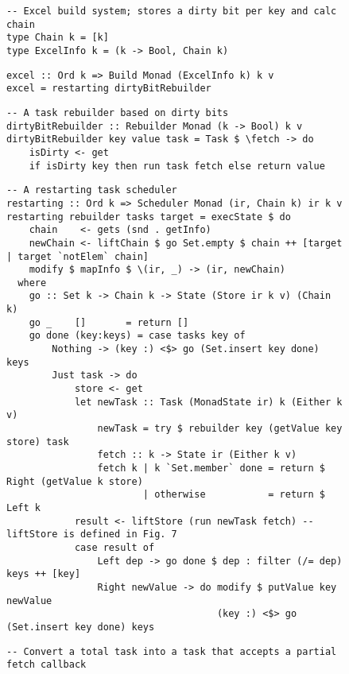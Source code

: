 \begin{figure}
\begin{verbatim}
-- Excel build system; stores a dirty bit per key and calc chain
type Chain k = [k]
type ExcelInfo k = (k -> Bool, Chain k)
\end{verbatim}
\vspace{0mm}
\begin{verbatim}
excel :: Ord k => Build Monad (ExcelInfo k) k v
excel = restarting dirtyBitRebuilder
\end{verbatim}
\vspace{0mm}
\begin{verbatim}
-- A task rebuilder based on dirty bits
dirtyBitRebuilder :: Rebuilder Monad (k -> Bool) k v
dirtyBitRebuilder key value task = Task $ \fetch -> do
    isDirty <- get
    if isDirty key then run task fetch else return value
\end{verbatim}
\vspace{0mm}
\begin{verbatim}
-- A restarting task scheduler
restarting :: Ord k => Scheduler Monad (ir, Chain k) ir k v
restarting rebuilder tasks target = execState $ do
    chain    <- gets (snd . getInfo)
    newChain <- liftChain $ go Set.empty $ chain ++ [target | target `notElem` chain]
    modify $ mapInfo $ \(ir, _) -> (ir, newChain)
  where
    go :: Set k -> Chain k -> State (Store ir k v) (Chain k)
    go _    []       = return []
    go done (key:keys) = case tasks key of
        Nothing -> (key :) <$> go (Set.insert key done) keys
        Just task -> do
            store <- get
            let newTask :: Task (MonadState ir) k (Either k v)
                newTask = try $ rebuilder key (getValue key store) task
                fetch :: k -> State ir (Either k v)
                fetch k | k `Set.member` done = return $ Right (getValue k store)
                        | otherwise           = return $ Left k
            result <- liftStore (run newTask fetch) -- liftStore is defined in Fig. 7
            case result of
                Left dep -> go done $ dep : filter (/= dep) keys ++ [key]
                Right newValue -> do modify $ putValue key newValue
                                     (key :) <$> go (Set.insert key done) keys
\end{verbatim}
\vspace{0mm}
\begin{verbatim}
-- Convert a total task into a task that accepts a partial fetch callback

\end{verbatim}
\end{figure}

